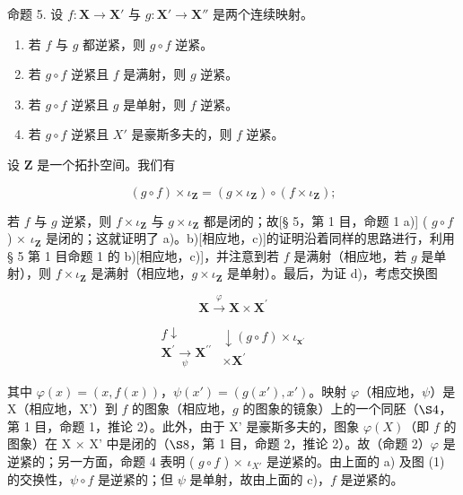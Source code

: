 命题 5. 设 \(f: \mathbf{X} \to \mathbf{X}'\) 与 \(g: \mathbf{X}' \to \mathbf{X}''\) 是两个连续映射。

\begin{enumerate}
\def\labelenumi{\alph{enumi})}
\item
  若 \(f\) 与 \(g\) 都逆紧，则 \(g \circ f\) 逆紧。
\item
  若 \(g \circ f\) 逆紧且 \(f\) 是满射，则 \(g\) 逆紧。
\item
  若 \(g \circ f\) 逆紧且 \(g\) 是单射，则 \(f\) 逆紧。
\item
  若 \(g \circ f\) 逆紧且 \(X'\) 是豪斯多夫的，则 \(f\) 逆紧。
\end{enumerate}

设 \(\mathbf{Z}\) 是一个拓扑空间。我们有

\[
(g \circ f) \times \iota_ {\mathbf {Z}} = (g \times \iota_ {\mathbf {Z}}) \circ (f \times \iota_ {\mathbf {Z}});
\]

若 \(f\) 与 \(g\) 逆紧，则 \(f \times \iota_{\mathbf{Z}}\) 与 \(g \times \iota_{\mathbf{Z}}\) 都是闭的；故{[}§ 5，第 1 目，命题 1 a){]} ( \(g \circ f\) ) × \(\iota_{\mathbf{Z}}\) 是闭的；这就证明了 a)。b){[}相应地，c){]}的证明沿着同样的思路进行，利用 § 5 第 1 目命题 1 的 b){[}相应地，c){]}，并注意到若 \(f\) 是满射（相应地，若 \(g\) 是单射），则 \(f \times \iota_{\mathbf{Z}}\) 是满射（相应地，\(g \times \iota_{\mathbf{Z}}\) 是单射）。最后，为证 d)，考虑交换图

\[
\mathbf {X} \stackrel {\varphi} {\rightarrow} \mathbf {X} \times \mathbf {X} ^ {\prime}\tag{1}
\]

\[
\begin{array}{c} f \downarrow \\ \mathbf {X} ^ {\prime} \xrightarrow [ \psi ]{} \mathbf {X} ^ {\prime \prime} \end{array} \begin{array}{c} \downarrow (g \circ f) \times \iota_ {\mathbf {x} ^ {\prime}} \\ \times \mathbf {X} ^ {\prime} \end{array}
\]

其中 \(\varphi(x) = (x, f(x))\)，\(\psi(x') = (g(x'), x')\)。映射 \(\varphi\)（相应地，\(\psi\)）是 X（相应地，X'）到 \(f\) 的图象（相应地，\(g\) 的图象的镜象）上的一个同胚（\(\S 4\)，第 1 目，命题 1，推论 2）。此外，由于 X' 是豪斯多夫的，图象 \(\varphi(X)\)（即 \(f\) 的图象）在 X × X' 中是闭的（\(\S 8\)，第 1 目，命题 2，推论 2）。故（命题 2）\(\varphi\) 是逆紧的；另一方面，命题 4 表明 ( \(g \circ f\) ) × \(\iota_{X'}\) 是逆紧的。由上面的 a) 及图 (1) 的交换性，\(\psi \circ f\) 是逆紧的；但 \(\psi\) 是单射，故由上面的 c)，\(f\) 是逆紧的。

